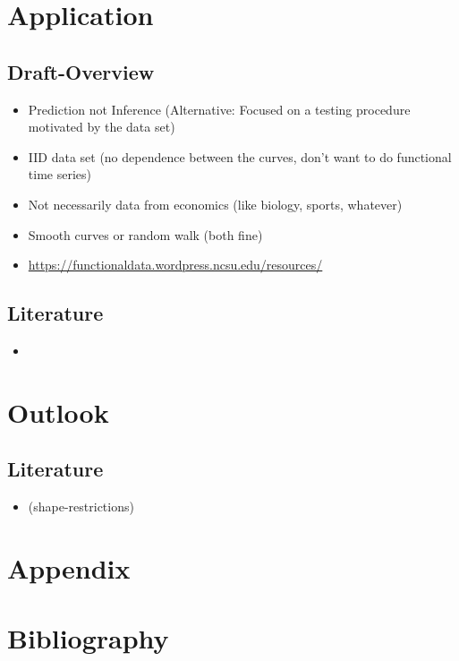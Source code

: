 \documentclass[11pt,twoside,a4paper]{article}
\begin{document}
	\newpage
	\section{Application}

	\subsection{Draft-Overview}
	\begin{itemize}
		\item Prediction not Inference (Alternative: Focused on a testing procedure motivated by the data set)
		\item IID data set (no dependence between the curves, don't want to do functional time series)
		\item Not necessarily data from economics (like biology, sports, whatever)
		\item Smooth curves or random walk (both fine)
		\item \href{https://functionaldata.wordpress.ncsu.edu/resources/}{https://functionaldata.wordpress.ncsu.edu/resources/}
	\end{itemize}
	
	\subsection{Literature}
	\begin{itemize}
		\item \cite{carey_life_2002}
	\end{itemize}

	\section{Outlook}
	
	\subsection{Literature}
	\begin{itemize}
		\item \cite{James.2009} (shape-restrictions)
	\end{itemize}
	
	\section{Appendix}
	
	\newpage
	
	\section{Bibliography}
	\printbibliography[heading=none]	
	
\end{document}
